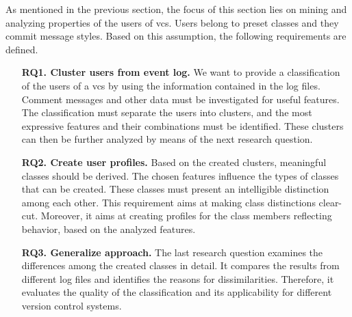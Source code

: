 
As mentioned in the previous section, the focus of this section lies on mining and analyzing properties of the users of \gls{vcs}. Users belong to preset classes and they commit message styles. Based on this assumption, the following requirements are defined.

\begin{itemize} %
      
\item[\textbf{RQ1. Cluster users from event log.}] 
We want to provide a classification of the users of a \gls{vcs} by using the information contained in the log files. Comment messages and other data must be investigated for useful features. The classification must separate the users into clusters, and the most expressive features and their combinations must be identified.  These clusters can then be further analyzed by means of the next research question.

\item[\textbf{RQ2. Create user profiles.}]
Based on the created clusters, meaningful classes should be derived. The chosen features influence the types of classes that can be created. These classes must present an intelligible distinction among each other. This requirement aims at making class distinctions clear-cut. Moreover, it aims at creating profiles for the class members reflecting behavior, based on the analyzed features.

\item[\textbf{RQ3. Generalize approach.}]
The last research question examines the differences among the created classes in detail. It compares the results from different log files and identifies the reasons for dissimilarities. Therefore, it evaluates the quality of the classification and its applicability for different version control systems.

\end{itemize}

